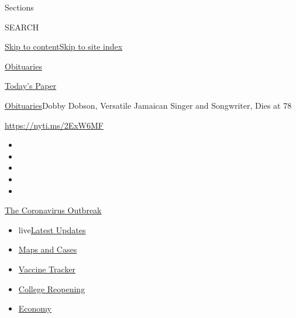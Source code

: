 Sections

SEARCH

\protect\hyperlink{site-content}{Skip to
content}\protect\hyperlink{site-index}{Skip to site index}

\href{https://www.nytimes3xbfgragh.onion/section/obituaries}{Obituaries}

\href{https://myaccount.nytimes3xbfgragh.onion/auth/login?response_type=cookie\&client_id=vi}{}

\href{https://www.nytimes3xbfgragh.onion/section/todayspaper}{Today's
Paper}

\href{/section/obituaries}{Obituaries}\textbar{}Dobby Dobson, Versatile
Jamaican Singer and Songwriter, Dies at 78

\url{https://nyti.ms/2ExW6MF}

\begin{itemize}
\item
\item
\item
\item
\item
\end{itemize}

\href{https://www.nytimes3xbfgragh.onion/news-event/coronavirus?action=click\&pgtype=Article\&state=default\&region=TOP_BANNER\&context=storylines_menu}{The
Coronavirus Outbreak}

\begin{itemize}
\tightlist
\item
  live\href{https://www.nytimes3xbfgragh.onion/2020/08/04/world/coronavirus-covid-19.html?action=click\&pgtype=Article\&state=default\&region=TOP_BANNER\&context=storylines_menu}{Latest
  Updates}
\item
  \href{https://www.nytimes3xbfgragh.onion/interactive/2020/us/coronavirus-us-cases.html?action=click\&pgtype=Article\&state=default\&region=TOP_BANNER\&context=storylines_menu}{Maps
  and Cases}
\item
  \href{https://www.nytimes3xbfgragh.onion/interactive/2020/science/coronavirus-vaccine-tracker.html?action=click\&pgtype=Article\&state=default\&region=TOP_BANNER\&context=storylines_menu}{Vaccine
  Tracker}
\item
  \href{https://www.nytimes3xbfgragh.onion/2020/08/02/us/covid-college-reopening.html?action=click\&pgtype=Article\&state=default\&region=TOP_BANNER\&context=storylines_menu}{College
  Reopening}
\item
  \href{https://www.nytimes3xbfgragh.onion/live/2020/08/03/business/stock-market-today-coronavirus?action=click\&pgtype=Article\&state=default\&region=TOP_BANNER\&context=storylines_menu}{Economy}
\end{itemize}


